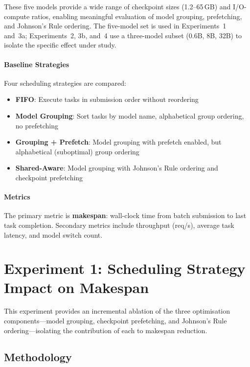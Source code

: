 \documentclass[logo,bsc,singlespacing,parskip,online]{infthesis}
\begin{document}
These five models provide a wide range of checkpoint sizes (1.2--65\,GB) and I/O-compute ratios, enabling meaningful evaluation of model grouping, prefetching, and Johnson's Rule ordering. The five-model set is used in Experiments~1 and~3a; Experiments~2, 3b, and~4 use a three-model subset (0.6B, 8B, 32B) to isolate the specific effect under study.

\paragraph{Baseline Strategies}
Four scheduling strategies are compared:
\begin{itemize}
\item \textbf{FIFO}: Execute tasks in submission order without reordering
\item \textbf{Model Grouping}: Sort tasks by model name, alphabetical group ordering, no prefetching
\item \textbf{Grouping + Prefetch}: Model grouping with prefetch enabled, but alphabetical (suboptimal) group ordering
\item \textbf{Shared-Aware}: Model grouping with Johnson's Rule ordering and checkpoint prefetching
\end{itemize}

\paragraph{Metrics}
The primary metric is \textbf{makespan}: wall-clock time from batch submission to last task completion. Secondary metrics include throughput (req/s), average task latency, and model switch count.

\section{Experiment 1: Scheduling Strategy Impact on Makespan}

This experiment provides an incremental ablation of the three optimisation components---model grouping, checkpoint prefetching, and Johnson's Rule ordering---isolating the contribution of each to makespan reduction.

\subsection{Methodology}
\end{document}
